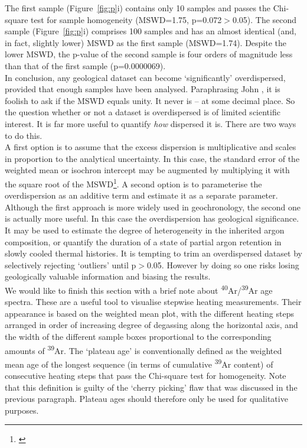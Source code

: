 \documentclass{article}
\begin{document}
The first sample (Figure~\ref{fig:p}i) contains only 10 samples and
passes the Chi-square test for sample homogeneity (MSWD=1.75,
p=0.072$>$0.05).  The second sample (Figure~\ref{fig:p}i) comprises
100 samples and has an almost identical (and, in fact, slightly lower)
MSWD as the first sample (MSWD=1.74). Despite the lower MSWD, the
p-value of the second sample is four orders of magnitude less than
that of the first sample (p=0.0000069).\\

In conclusion, any geological dataset can become `significantly'
overdispersed, provided that enough samples have been analysed.
Paraphrasing John \citet{tukey1991}, it is foolish to ask if the MSWD
equals unity. It never is -- at some decimal place.  So the question
whether or not a dataset is overdispersed is of limited scientific
interest.  It is far more useful to quantify \emph{how} dispersed it
is. There are two ways to do this.\\

A first option is to assume that the excess dispersion is
multiplicative and scales in proportion to the analytical
uncertainty. In this case, the standard error of the weighted mean or
isochron intercept may be augmented by multiplying it with the square
root of the MSWD\footnote[2]{\citet[see][for a derivation of the
    $\sqrt{\mathrm{MSWD}}$ rule, for details about the alternative
    parameterisation, and software that implements
    it.]{vermeesch2018c}}.  A second option is to parameterise the
overdispersion as an additive term and estimate it as a separate
parameter\footnotemark[\value{footnote}].\\

Although the first approach is more widely used in geochronology, the
second one is actually more useful. In this case the overdispersion
has geological significance. It may be used to estimate the degree of
heterogeneity in the inherited argon composition, or quantify the
duration of a state of partial argon retention in slowly cooled
thermal histories. It is tempting to trim an overdispersed dataset by
selectively rejecting `outliers' until p$>$0.05. However by doing so
one risks losing geologically valuable information and biasing the
results.\\

We would like to finish this section with a brief note about
\textsuperscript{40}Ar/\textsuperscript{39}Ar age spectra. These are a
useful tool to visualise stepwise heating measurements. Their
appearance is based on the weighted mean plot, with the different
heating steps arranged in order of increasing degree of degassing
along the horizontal axis, and the width of the different sample boxes
proportional to the corresponding amounts of \textsuperscript{39}Ar.
The `plateau age' is conventionally defined as the weighted mean age
of the longest sequence (in terms of cumulative \textsuperscript{39}Ar
content) of consecutive heating steps that pass the Chi-square test
for homogeneity. Note that this definition is guilty of the `cherry
picking' flaw that was discussed in the previous paragraph.  Plateau
ages should therefore only be used for qualitative purposes.
\end{document}

